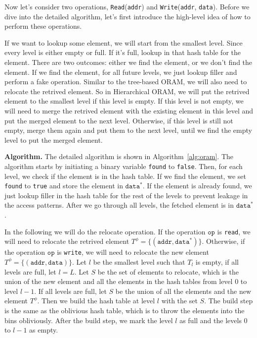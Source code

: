 Now let's consider two operations, \texttt{Read}(\texttt{addr}) and \texttt{Write}(\texttt{addr}, \texttt{data}).
Before we dive into the detailed algorithm, let's first introduce the high-level idea of how to perform these operations.

If we want to lookup some element, we will start from the smallest level.
Since every level is either empty or full. If it's full, lookup in that hash table for the element.
There are two outcomes: either we find the element, or we don't find the element.
If we find the element, for all future levels, we just lookup filler and perform a fake operation.
Similar to the tree-based ORAM, we will also need to relocate the retrived element.
So in Hierarchical ORAM, we will put the retrived element to the smallest level if this level is empty.
If this level is not empty, we will need to merge the retrived element with the existing element in this level and put the merged element to the next level. 
Otherwise, if this level is still not empty, merge them again and put them to the next level, until we find the empty level to put the merged element.

\textbf{Algorithm.} The detailed algorithm is shown in Algorithm~\ref{alg:oram}. The algorithm starts by initiating a binary variable \texttt{found} to \texttt{false}.
Then, for each level, we check if the element is in the hash table. 
If we find the element, we set \texttt{found} to \texttt{true} and store the element in $\texttt{data}^*$.
If the element is already found, we just lookup filler in the hash table for the rest of the levels to prevent leakage in the access patterns.
After we go through all levels, the fetched element is in $\texttt{data}^*$.

In the following we will do the relocate operation.
If the operation $\texttt{op}$ is \texttt{read}, we will need to relocate the retrived element $T^\phi = \{(\texttt{addr}, \texttt{data}^*)\}$.
Otherwise, if the operation $\texttt{op}$ is \texttt{write}, we will need to relocate the new element $T^\phi = \{(\texttt{addr}, \texttt{data})\}$.
Let $l$ be the smallest level such that $T_l$ is empty, if all levels are full, let $l = L$.
Let $S$ be the set of elements to relocate, which is the union of the new element and all the elements in the hash tables from level $0$ to level $l-1$.
If all levels are full, let $S$ be the union of all the elements and the new element $T^\phi$.
Then we build the hash table at level $l$ with the set $S$.
The build step is the same as the oblivious hash table, which is to throw the elements into the bins obliviously.
After the build step, we mark the level $l$ as full and the levels $0$ to $l-1$ as empty.

